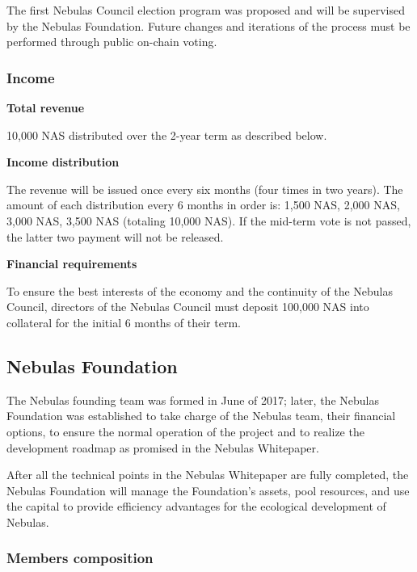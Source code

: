 The first Nebulas Council election program was proposed and will be supervised by the Nebulas Foundation. Future changes and iterations of the process must be performed through public on-chain voting.


\subsubsection{Income}

\textbf{Total revenue}

10,000 NAS distributed over the 2-year term as described below.

\vspace{2em}

\textbf{Income distribution}

The revenue will be issued once every six months (four times in two years). The amount of each distribution every 6 months in order is: 1,500 NAS, 2,000 NAS, 3,000 NAS, 3,500 NAS (totaling 10,000 NAS). If the mid-term vote is not passed, the latter two payment will not be released.

\vspace{2em}

\textbf{Financial requirements}

To ensure the best interests of the economy and the continuity of the Nebulas Council, directors of the Nebulas Council must deposit 100,000 NAS into collateral for the initial 6 months of their term.

\vspace{2em}

\subsection{Nebulas Foundation}

The Nebulas founding team was formed in June of 2017; later, the Nebulas Foundation was established to take charge of the Nebulas team, their financial options, to ensure the normal operation of the project and to realize the development roadmap as promised in the Nebulas Whitepaper.

After all the technical points in the Nebulas Whitepaper are fully completed, the Nebulas Foundation will manage the Foundation’s assets, pool resources, and use the capital to provide efficiency advantages for the ecological development of Nebulas.

\subsubsection{Members composition}

